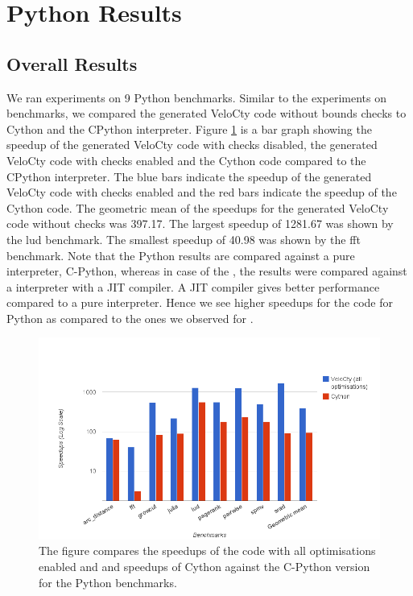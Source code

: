 \section{Python Results}
\subsection{Overall Results}
We ran experiments on 9 Python benchmarks. Similar to the experiments on \matlab benchmarks, we compared the generated VeloCty code without bounds checks to Cython and the CPython interpreter. Figure \ref{fig:results_cwochecks_py} is a bar graph showing the speedup of the generated VeloCty code with checks disabled, the generated VeloCty code with checks enabled and the Cython code compared to the CPython interpreter. The blue bars indicate the speedup of the generated VeloCty code with checks enabled and the red bars indicate the speedup of the Cython code. The geometric mean of the speedups for the generated VeloCty code without checks was 397.17. The largest speedup of 1281.67 was shown by the lud benchmark. The smallest speedup of 40.98 was shown by the fft benchmark. Note that the Python results are compared against a pure interpreter, C-Python, whereas in case of the \matlab, the results were compared against a interpreter with a JIT compiler. A JIT compiler gives better performance compared to a pure interpreter. Hence we see higher speedups for the \velocty code for Python as compared to the ones we observed for \matlab. 
\begin{figure}[htbp]
\centering
\includegraphics[scale=0.5]{Figures/results_cwochecks_py.png}
\caption{The figure compares the speedups of the \velocty code with all optimisations enabled and and speedups of Cython against the C-Python version for the Python benchmarks.}
\label{fig:results_cwochecks_py}
\end{figure}

